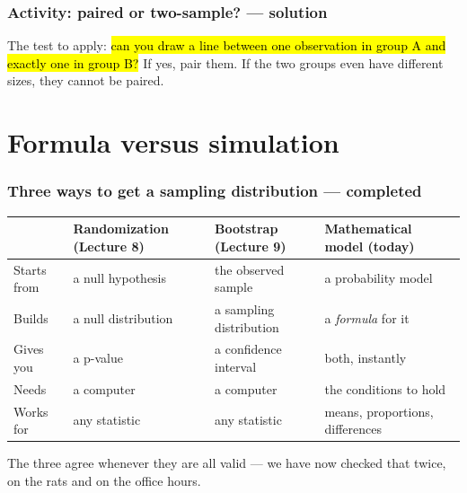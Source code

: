\documentclass[slidestop,compress,mathserif]{beamer}
\begin{document}
\begin{frame}
\frametitle{Activity: paired or two-sample? --- solution}


\vspace{0.4em}
The test to apply: \hl{can you draw a line between one observation in group A and exactly one in group B?} If yes, pair them. If the two groups even have different sizes, they cannot be paired.

\end{frame}

\section{Formula versus simulation}
\begin{frame}
\frametitle{Three ways to get a sampling distribution --- completed}

{\scriptsize
\begin{center}
\setlength{\tabcolsep}{4pt}
\begin{tabular}{p{}p{}p{}p{}}
\toprule
& \textbf{Randomization} \newline (Lecture 8) & \textbf{Bootstrap} \newline (Lecture 9) & \textbf{Mathematical model} \newline (today) \\
\midrule
Starts from & a null hypothesis & the observed sample & a probability model \\
Builds & a null distribution & a sampling distribution & a \emph{formula} for it \\
Gives you & a p-value & a confidence interval & both, instantly \\
Needs & a computer & a computer & the conditions to hold \\
Works for & any statistic & any statistic & means, proportions, differences \\
\bottomrule
\end{tabular}
\end{center}}

\vspace{0.2em}
{\small The three agree whenever they are all valid --- we have now checked that twice, on the rats and on the office hours.}

\end{frame}
\end{document}
